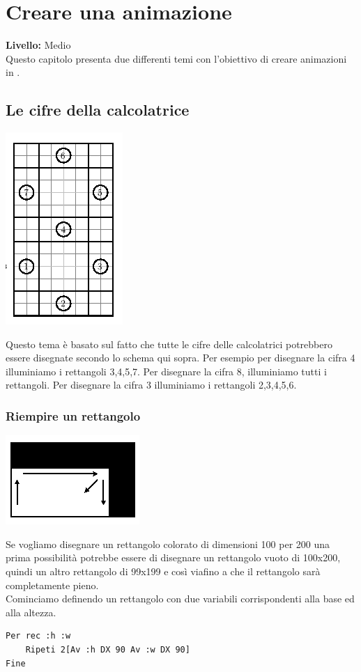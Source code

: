 \chapter{Creare una animazione}
{ }\hfill\textbf{Livello:} Medio\\
Questo capitolo presenta due differenti temi con l'obiettivo di creare animazioni in \xlogo.


\section{Le cifre della calcolatrice}
\begin{center}
	\includegraphics{pics/animation-chiffre.png}
\end{center}

Questo tema è basato sul fatto che tutte le cifre delle calcolatrici potrebbero essere disegnate secondo lo schema qui sopra. Per esempio per disegnare la cifra 4 illuminiamo i rettangoli 3,4,5,7. Per disegnare la cifra 8, illuminiamo tutti i rettangoli. Per disegnare la cifra 3 illuminiamo i rettangoli 2,3,4,5,6.

\subsection{Riempire un rettangolo}
\begin{center}
	\includegraphics{pics/animation-rectangle.png}
\end{center}
Se vogliamo disegnare un rettangolo colorato di dimensioni 100 per 200 una prima possibilità potrebbe essere di disegnare un rettangolo vuoto di 100x200, quindi un altro rettangolo di 99x199 e così via\textellipsis fino a che il rettangolo sarà completamente pieno.\\
Cominciamo definendo un rettangolo con due variabili corrispondenti alla base ed alla altezza.
\begin{lstlisting}[caption="Un semplice rettangolo dati i due lati"]
Per rec :h :w
	Ripeti 2[Av :h DX 90 Av :w DX 90]
Fine
\end{lstlisting}

